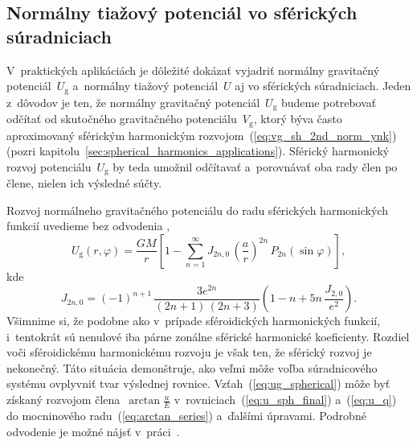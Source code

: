\documentclass[a4paper, 12pt]{book}
\newcommand{\gidx}{\mathrm g}
\begin{document}
\subsection{Normálny tiažový potenciál vo sférických súradniciach}
\label{sec:normal_gravity_potential_in_spherical_coords}

V~praktických aplikáciách je dôležité dokázať vyjadriť normálny gravitačný 
potenciál~$U_\gidx$ a~normálny tiažový potenciál~$U$ aj vo sférických 
súradniciach.  Jeden z~dôvodov je ten, že normálny gravitačný 
potenciál~$U_\gidx$ budeme potrebovať odčítať od skutočného gravitačného 
potenciálu~$V_\gidx$, ktorý býva často aproximovaný sférickým harmonickým 
rozvojom~(\ref{eq:vg_sh_2nd_norm_ynk}) (pozri 
kapitolu~\ref{sec:spherical_harmonics_applications}).  Sférický harmonický 
rozvoj potenciálu~$U_\gidx$ by teda umožnil odčítavať a~porovnávať oba rady 
člen po člene, nielen ich výsledné súčty.

Rozvoj normálneho gravitačného potenciálu do radu sférických harmonických 
funkcií uvedieme bez odvodenia \parencite{Moritz1967},
%
\begin{equation}
\label{eq:ug_spherical}
U_\gidx(r, \varphi) = \frac{GM}{r} \left[ 1 - \sum_{n = 1}^{\infty} J_{2n,0} \, 
\left( \frac{a}{r} \right)^{2n} \, P_{2n}(\sin\varphi) \right]{,}
\end{equation}
%
kde
%
\begin{equation}
\label{eq:j2n0}
J_{2n,0} = (-1)^{n + 1} \, \frac{3e^{2n}}{(2n + 1) \, (2n + 3)} \left( 
1 - n + 5n \, \frac{J_{2,0}}{e^2} \right){.}
\end{equation}
%
Všimnime si, že podobne ako v~prípade sféroidických harmonických funkcií, 
i~tentokrát sú nenulové iba párne zonálne sférické harmonické koeficienty.  
Rozdiel voči sféroidickému harmonickému rozvoju je však ten, že sférický rozvoj 
je nekonečný.  Táto situácia demonštruje, ako veľmi môže voľba súradnicového 
systému ovplyvniť tvar výslednej rovnice.  Vzťah~(\ref{eq:ug_spherical}) môže 
byť získaný rozvojom člena~$\arctan\frac{u}{E}$ 
v~rovniciach~(\ref{eq:u_sph_final}) a~(\ref{eq:u_q}) do mocninového 
radu~(\ref{eq:arctan_series}) a~ďalšími úpravami.  Podrobné odvodenie je možné 
nájsť v~práci~\textcite{Moritz1967}.
\end{document}
